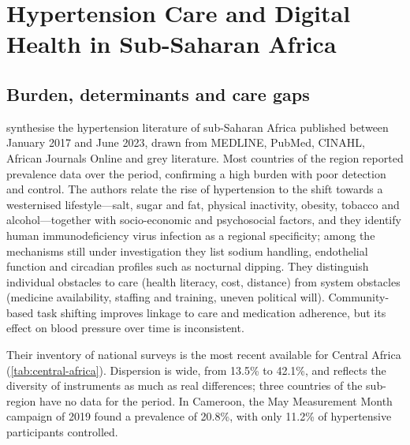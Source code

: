 \documentclass[12pt,a4paper,oneside]{report}
\begin{document}
\section{Hypertension Care and Digital Health in Sub-Saharan Africa}\label{sec:lr-regional}\label{sec:diagnosis}

\subsection{Burden, determinants and care gaps}

\Textcite{gafane2024} synthesise the hypertension literature of sub-Saharan Africa published between January 2017 and June 2023, drawn from MEDLINE, PubMed, CINAHL, African Journals Online and grey literature. Most countries of the region reported prevalence data over the period, confirming a high burden with poor detection and control. The authors relate the rise of hypertension to the shift towards a westernised lifestyle---salt, sugar and fat, physical inactivity, obesity, tobacco and alcohol---together with socio-economic and psychosocial factors, and they identify human immunodeficiency virus infection as a regional specificity; among the mechanisms still under investigation they list sodium handling, endothelial function and circadian profiles such as nocturnal dipping. They distinguish individual obstacles to care (health literacy, cost, distance) from system obstacles (medicine availability, staffing and training, uneven political will). Community-based task shifting improves linkage to care and medication adherence, but its effect on blood pressure over time is inconsistent.

Their inventory of national surveys is the most recent available for Central Africa (\cref{tab:central-africa}). Dispersion is wide, from 13.5\% to 42.1\%, and reflects the diversity of instruments as much as real differences; three countries of the sub-region have no data for the period. In Cameroon, the May Measurement Month campaign of 2019 found a prevalence of 20.8\%, with only 11.2\% of hypertensive participants controlled.
\end{document}
